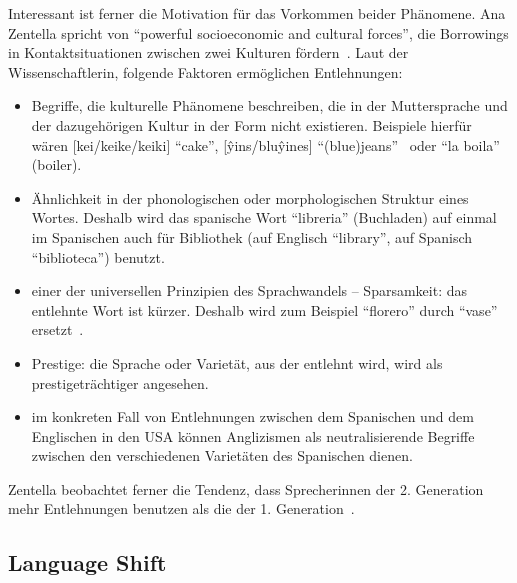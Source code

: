Interessant ist ferner die Motivation für das Vorkommen beider Phänomene.
Ana Zentella spricht von ``powerful socioeconomic and cultural forces'', die Borrowings in Kontaktsituationen zwischen zwei Kulturen fördern~\cite{Zentella90}. %
Laut der Wissenschaftlerin, folgende Faktoren ermöglichen Entlehnungen:
\begin{itemize}
  \item Begriffe, die kulturelle Phänomene beschreiben, die in der Muttersprache und der dazugehörigen Kultur in der Form nicht existieren. Beispiele hierfür wären [kei/keike/keiki] ``cake'', [\^yins/blu\^yines] ``(blue)jeans''~\cite{Zentella90} oder ``la boila'' (boiler). %
  \item Ähnlichkeit in der phonologischen oder morphologischen Struktur eines Wortes.
    Deshalb wird das spanische Wort ``libreria'' (Buchladen) auf einmal im Spanischen auch für Bibliothek (auf Englisch ``library'', auf Spanisch ``biblioteca'') benutzt. %
  \item einer der universellen Prinzipien des Sprachwandels -- Sparsamkeit: das entlehnte Wort ist kürzer. Deshalb wird zum Beispiel ``florero'' durch ``vase'' ersetzt~\cite{Zentella90}.%
  \item Prestige: die Sprache oder Varietät, aus der entlehnt wird, wird als prestigeträchtiger angesehen.
  \item im konkreten Fall von Entlehnungen zwischen dem Spanischen und dem Englischen in den USA können Anglizismen als neutralisierende Begriffe zwischen den verschiedenen Varietäten des Spanischen dienen.

\end{itemize}

Zentella beobachtet ferner die Tendenz, dass Sprecherinnen der 2. Generation mehr Entlehnungen benutzen als die der 1. Generation~\cite{Zentella90}.%


\subsection{Language Shift}


